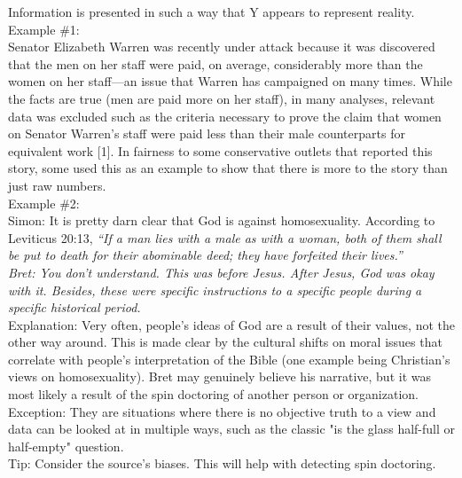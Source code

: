 \documentclass[a4paper,12pt,single,pdftex]{scrbook}
\begin{document}
    
      Information is presented in such a way that Y appears to represent reality.
    \\

    
      Example \#1:
    \\

    
      Senator Elizabeth Warren was recently under attack because it was discovered that the men on her staff were paid, on average, considerably more than the women on her staff—an issue that Warren has campaigned on many times. While the facts are true (men are paid more on her staff), in many analyses, relevant data was excluded such as the criteria necessary to prove the claim that women on Senator Warren's staff were paid less than their male counterparts for equivalent work [1]. In fairness to some conservative outlets that reported this story, some used this as an example to show that there is more to the story than just raw numbers.
    \\

    
      Example \#2:
    \\

    
      Simon: It is pretty darn clear that God is against homosexuality. According to Leviticus 20:13, {\it “If a man lies with a male as with a woman, both of them shall be put to death for their abominable deed; they have forfeited their lives.”}
    \\

    
      {\it Bret: You don't understand. This was before Jesus. After Jesus, God was okay with it. Besides, these were specific instructions to a specific people during a specific historical period.}
    \\

    
      Explanation: Very often, people's ideas of God are a result of their values, not the other way around. This is made clear by the cultural shifts on moral issues that correlate with people's interpretation of the Bible (one example being Christian's views on homosexuality). Bret may genuinely believe his narrative, but it was most likely a result of the spin doctoring of another person or organization.
    \\

    
      Exception: They are situations where there is no objective truth to a view and data can be looked at in multiple ways, such as the classic "is the glass half-full or half-empty" question.
    \\

    
      Tip: Consider the source's biases. This will help with detecting spin doctoring.
    \\
\end{document}
